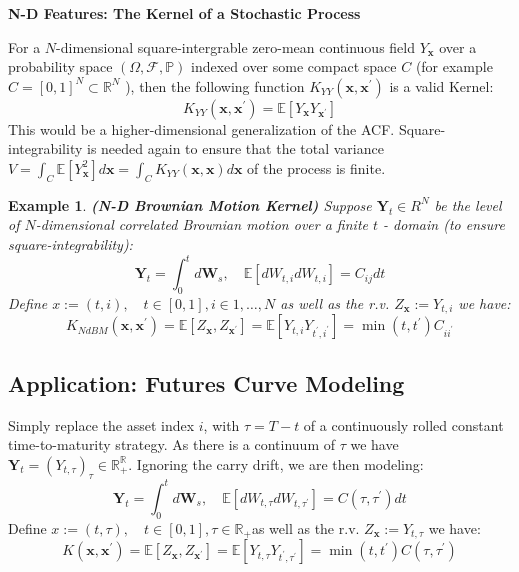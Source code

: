 \documentclass[11pt]{article}
\theoremstyle{plain} %
\newtheorem{example}[theorem]{Example}
\theoremstyle{remark}
\begin{document}
\textbf{N-D Features: The Kernel of a Stochastic Process}

For a $N$-dimensional square-intergrable zero-mean continuous field
$Y_{\mathbf{x}}$ over a probability space $(\Omega, \mathcal{F}, \mathbb{P})$ indexed over
some compact space $C$ (for example $C=[0,1]^{N} \subset \mathbb{R}^{N}$ ), then
the following function $K_{Y Y}\left(\mathbf{x}, \mathbf{x}^{\prime}\right)$ is a
valid Kernel:
$$
  K_{Y Y}\left(\mathbf{x}, \mathbf{x}^{\prime}\right)=\mathbb{E}\left[Y_{\mathbf{x}} Y_{\mathbf{x}^{\prime}}\right]
$$
This would be a higher-dimensional generalization of the ACF.
Square-integrability is needed again to ensure that the total variance
$V=\int_{C} \mathbb{E}\left[Y_{\mathbf{x}}^{2}\right] d \mathbf{x}=\int_{C} K_{Y
      Y}(\mathbf{x}, \mathbf{x}) d \mathbf{x}$ of the process is finite.

\begin{example}
  \textbf{(N-D Brownian Motion Kernel)} Suppose $\mathbf{Y}_{t} \in R^{N}$ be
  the level of $N$-dimensional correlated Brownian motion over a finite $t$ -
  domain (to ensure square-integrability):
  $$
    \mathbf{Y}_{t}=\int_{0}^{t} d \mathbf{W}_{s}, \quad \mathbb{E}\left[d W_{t, i} d W_{t, i}\right]=C_{i j} d t
  $$
  Define $x:=(t, i), \quad t \in[0,1], i \in 1, \ldots, N$ as well as the r.v.
  $Z_{\mathbf{x}}:=Y_{t, i}$ we have:
  $$
    K_{N d B M}\left(\mathbf{x}, \mathbf{x}^{\prime}\right)=\mathbb{E}\left[Z_{\mathbf{x}}, Z_{\mathbf{x}^{\prime}}\right]=\mathbb{E}\left[Y_{t, i} Y_{t^{\prime}, i^{\prime}}\right]=\min \left(t, t^{\prime}\right) C_{i i^{\prime}}
  $$
\end{example}

\subsection{Application: Futures Curve Modeling}
Simply replace the asset index $i$, with $\tau=T-t$ of a continuously rolled
constant time-to-maturity strategy. As there is a continuum of $\tau$ we have
$\mathbf{Y}_{t}=\left(Y_{t, \tau}\right)_{\tau} \in
  \mathbb{R}_{+}^{\mathbb{R}}$. Ignoring the carry drift, we are then modeling:
$$
  \mathbf{Y}_{t}=\int_{0}^{t} d \mathbf{W}_{s}, \quad \mathbb{E}\left[d W_{t, \tau} d W_{t, \tau^{\prime}}\right]=C\left(\tau, \tau^{\prime}\right) d t
$$
Define $x:=(t, \tau), \quad t \in[0,1], \tau \in \mathbb{R}_{+}$as well as the
r.v. $Z_{\mathbf{x}}:=Y_{t, \tau}$ we have:
$$
  K\left(\mathbf{x}, \mathbf{x}^{\prime}\right)=\mathbb{E}\left[Z_{\mathbf{x}}, Z_{\mathbf{x}^{\prime}}\right]=\mathbb{E}\left[Y_{t, \tau} Y_{t^{\prime}, \tau^{\prime}}\right]=\min \left(t, t^{\prime}\right) C\left(\tau, \tau^{\prime}\right)
$$
\end{document}

